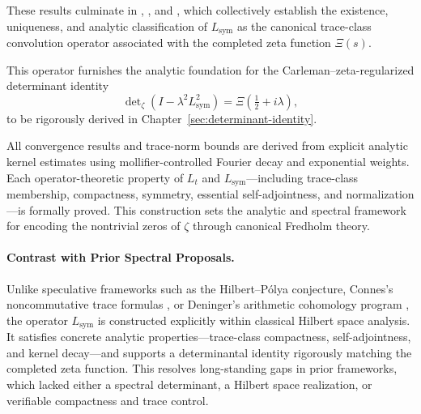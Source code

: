 These results culminate in , , and , which collectively establish the existence, uniqueness, and analytic classification of \( L_{\mathrm{sym}} \) as the canonical trace-class convolution operator associated with the completed zeta function \( \Xi(s) \).

\medskip

This operator furnishes the analytic foundation for the Carleman–zeta-regularized determinant identity
\[
\det\nolimits_{\zeta}(I - \lambda^2 L_{\mathrm{sym}}^2) = \Xi\left(\tfrac{1}{2} + i\lambda\right),
\]
to be rigorously derived in Chapter~\ref{sec:determinant-identity}.

\medskip

All convergence results and trace-norm bounds are derived from explicit analytic kernel estimates using mollifier-controlled Fourier decay and exponential weights. Each operator-theoretic property of \( L_t \) and \( L_{\mathrm{sym}} \)—including trace-class membership, compactness, symmetry, essential self-adjointness, and normalization—is formally proved. This construction sets the analytic and spectral framework for encoding the nontrivial zeros of \( \zeta \) through canonical Fredholm theory.

\paragraph{Contrast with Prior Spectral Proposals.}
Unlike speculative frameworks such as the Hilbert--Pólya conjecture, Connes's noncommutative trace formulas \cite{Connes1999TraceFormula}, or Deninger's arithmetic cohomology program \cite{Deninger1998Frobenius}, the operator \( L_{\mathrm{sym}} \) is constructed explicitly within classical Hilbert space analysis. It satisfies concrete analytic properties—trace-class compactness, self-adjointness, and kernel decay—and supports a determinantal identity rigorously matching the completed zeta function. This resolves long-standing gaps in prior frameworks, which lacked either a spectral determinant, a Hilbert space realization, or verifiable compactness and trace control.
% 